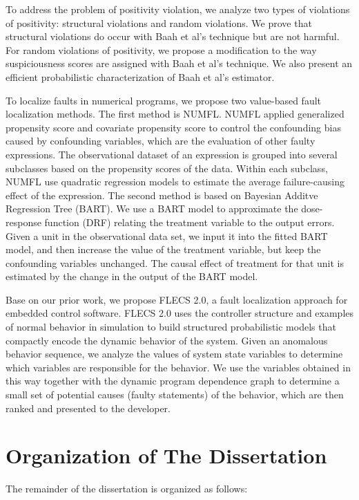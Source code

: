 To address the problem of positivity violation, we analyze two types of violations of positivity: structural violations and random violations. We prove that structural violations do occur with Baah et al's technique but are not harmful. For random violations of positivity, we propose a modification to the way suspiciousness scores are assigned with Baah et al's technique. We also present an efficient probabilistic characterization of Baah et al's estimator.

To localize faults in numerical programs, we propose two value-based fault localization methods. The first method is NUMFL. NUMFL applied generalized propensity score and covariate propensity score to control the confounding bias caused by confounding variables, which are the evaluation of other faulty expressions.  The  observational dataset of an expression is grouped into several subclasses based on the propensity scores of the data. Within each subclass, NUMFL use quadratic regression models to estimate the average failure-causing effect of the expression. The second method is based on Bayesian Additve Regression Tree (BART). We use a BART model to approximate the dose-response function (DRF) relating the treatment variable to the output errors. Given a unit in the observational data set, we input it into the fitted BART model, and then increase the value of the treatment variable, but keep the confounding variables unchanged. The causal effect of treatment for that unit is estimated by the change in the output of the BART model. 

Base on our prior work, we propose FLECS 2.0, a fault localization approach for embedded control software. FLECS 2.0 uses the controller structure and examples of normal behavior in simulation to build structured probabilistic models that compactly encode the dynamic behavior of the system. Given an anomalous behavior sequence, we analyze the values of system state variables to determine which variables are responsible for the behavior. We use the variables obtained in this way together with the dynamic program dependence graph to determine a small set of potential causes (faulty statements) of the behavior, which are then ranked and presented to the developer.

\section{Organization of The Dissertation}

The remainder of the dissertation is organized as follows:

